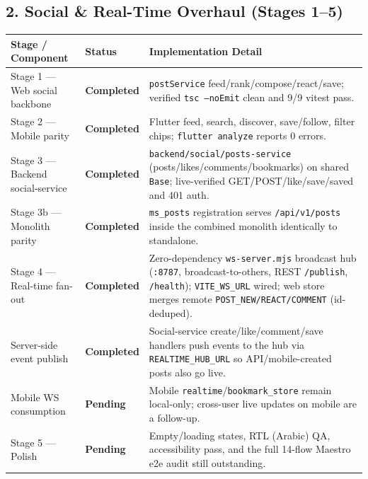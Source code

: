 \documentclass[11pt,a4paper]{article}
\newcommand{\status}[1]{\textcolor{masarengreen}{\bfseries #1}}
\newcommand{\gap}[1]{\textcolor{masarenred}{\bfseries #1}}
\newcommand{\code}[1]{\texttt{#1}}
\begin{document}
\subsection*{2. Social \& Real-Time Overhaul (Stages 1--5)}
\begin{tabularx}{\textwidth}{L{4.6cm}L{2.4cm}Y}
\toprule
\textbf{Stage / Component} & \textbf{Status} & \textbf{Implementation Detail} \\
\midrule
Stage 1 --- Web social backbone & \status{Completed} & \code{postService} feed/rank/compose/react/save; verified \code{tsc --noEmit} clean and 9/9 vitest pass. \\
\hline
Stage 2 --- Mobile parity & \status{Completed} & Flutter feed, search, discover, save/follow, filter chips; \code{flutter analyze} reports 0 errors. \\
\hline
Stage 3 --- Backend social-service & \status{Completed} & \code{backend/social/posts-service} (posts/likes/comments/bookmarks) on shared \code{Base}; live-verified GET/POST/like/save/saved and 401 auth. \\
\hline
Stage 3b --- Monolith parity & \status{Completed} & \code{ms\_posts} registration serves \code{/api/v1/posts} inside the combined monolith identically to standalone. \\
\hline
Stage 4 --- Real-time fan-out & \status{Completed} & Zero-dependency \code{ws-server.mjs} broadcast hub (\code{:8787}, broadcast-to-others, REST \code{/publish}, \code{/health}); \code{VITE\_WS\_URL} wired; web store merges remote \code{POST\_NEW/REACT/COMMENT} (id-deduped). \\
\hline
Server-side event publish & \status{Completed} & Social-service create/like/comment/save handlers push events to the hub via \code{REALTIME\_HUB\_URL} so API/mobile-created posts also go live. \\
\hline
Mobile WS consumption & \gap{Pending} & Mobile \code{realtime}/\code{bookmark\_store} remain local-only; cross-user live updates on mobile are a follow-up. \\
\hline
Stage 5 --- Polish & \gap{Pending} & Empty/loading states, RTL (Arabic) QA, accessibility pass, and the full 14-flow Maestro e2e audit still outstanding. \\
\bottomrule
\end{tabularx}

\vspace{0.6em}
\end{document}
